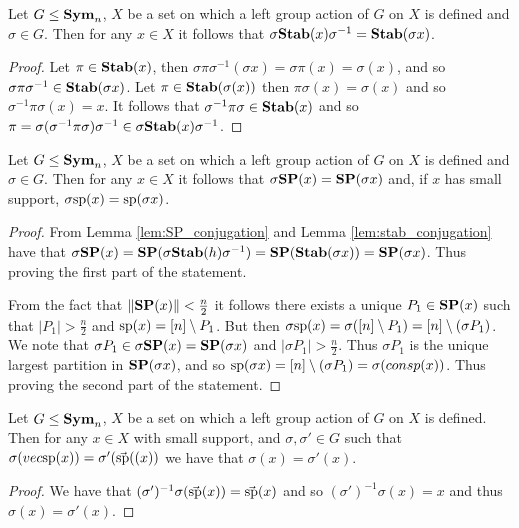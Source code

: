 \documentclass[../paper.tex]{subfiles}
\begin{document}
\begin{lem}
  \label{lem:stab_conjugation}
  Let $G \leq \text{\textbf{Sym}}_n$, $X$ be a set on which a left group action
  of $G$ on $X$ is defined and $\sigma \in G$. Then for any $x \in X$ it follows
  that $\sigma \text{\textbf{Stab}} (x) \sigma^{-1} = \text{\textbf{Stab}}(\sigma x)$.
\end{lem}

\begin{proof}
  Let $\pi \in \text{\textbf{Stab}}(x)$, then $\sigma \pi \sigma^{-1}(\sigma x) = \sigma \pi
  (x) = \sigma (x)$, and so $\sigma \pi \sigma^{-1} \in \text{\textbf{Stab}}(\sigma x)$. Let
  $\pi \in \text{\textbf{Stab}}(\sigma (x))$ then $\pi \sigma (x) = \sigma (x)$ and so
  $\sigma^{-1} \pi \sigma (x) = x$. It follows that $\sigma^{-1} \pi \sigma \in
  \text{\textbf{Stab}}(x)$ and so $\pi = \sigma (\sigma^{-1} \pi \sigma) \sigma ^{-1} \in
  \sigma \text{\textbf{Stab}}(x) \sigma^{-1}$.
\end{proof}

\begin{lem}
  \label{lem:support_mapping}
  Let $G \leq \text{\textbf{Sym}}_n$, $X$ be a set on which a left group action
  of $G$ on $X$ is defined and $\sigma \in G$. Then for any $x \in X$ it follows
  that $\sigma \text{\textbf{SP}} (x) = \text{\textbf{SP}} (\sigma x)$ and, if $x$ has small support, $\sigma
  \text{sp} (x) = \text{sp} (\sigma x)$.
\end{lem}
\begin{proof}
  From Lemma \ref{lem:SP_conjugation} and Lemma \ref{lem:stab_conjugation} have
  that $\sigma \text{\textbf{SP}} (x) = \text{\textbf{SP}}(\sigma \text{\textbf{Stab}}(h) \sigma^{-1}) = \text{\textbf{SP}} (\text{\textbf{Stab}}(\sigma
  x)) = \text{\textbf{SP}} (\sigma x)$. Thus proving the first part of the statement.

  From the fact that $\| \text{\textbf{SP}}(x) \| < \frac{n}{2}$ it follows there exists a
  unique $P_1 \in \text{\textbf{SP}}(x)$ such that $\vert P_1 \vert > \frac{n}{2}$ and
  $\text{sp}(x) = [n] \setminus P_1$. But then $\sigma \text{sp} (x) = \sigma([n]
  \setminus P_1) = [n] \setminus (\sigma P_1)$. We note that $\sigma P_1 \in
  \sigma \text{\textbf{SP}} (x) = \text{\textbf{SP}}(\sigma x)$ and $\vert \sigma P_1 \vert > \frac{n}{2}$.
  Thus $\sigma P_1$ is the unique largest partition in $\text{\textbf{SP}}(\sigma x)$, and so
  $\text{sp}(\sigma x) = [n]\setminus (\sigma P_1) = \sigma (consp(x))$. Thus
  proving the second part of the statement.
\end{proof}

\begin{lem}
  Let $G \leq \text{\textbf{Sym}}_n$, $X$ be a set on which a left group action
  of $G$ on $X$ is defined. Then for any $x \in X$ with small support, and
  $\sigma, \sigma' \in G$ such that $\sigma (vec{\text{sp}}(x)) = \sigma'
  (\vec{\text{sp}}((x))$ we have that $\sigma (x) = \sigma'(x)$.
\end{lem}
\begin{proof}
  We have that $(\sigma')^{-1}\sigma(\vec{\text{sp}}(x)) = \vec{\text{sp}}(x)$ and so
  $(\sigma')^{-1} \sigma (x) = x$ and thus $\sigma (x) = \sigma' (x)$.
\end{proof}
\end{document}
